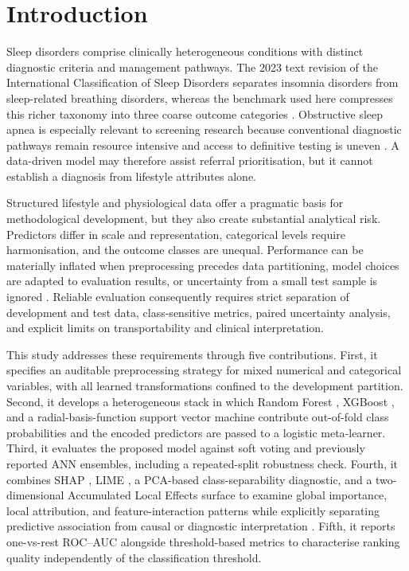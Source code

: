\documentclass{elektr}
\begin{document}
\section{Introduction}
Sleep disorders comprise clinically heterogeneous conditions with distinct diagnostic criteria and management pathways. The 2023 text revision of the International Classification of Sleep Disorders separates insomnia disorders from sleep-related breathing disorders, whereas the benchmark used here compresses this richer taxonomy into three coarse outcome categories \cite{aasm2023}. Obstructive sleep apnea is especially relevant to screening research because conventional diagnostic pathways remain resource intensive and access to definitive testing is uneven \cite{korkalainen2024,giorgi2025,bazoukis2023}. A data-driven model may therefore assist referral prioritisation, but it cannot establish a diagnosis from lifestyle attributes alone.

Structured lifestyle and physiological data offer a pragmatic basis for methodological development, but they also create substantial analytical risk. Predictors differ in scale and representation, categorical levels require harmonisation, and the outcome classes are unequal. Performance can be materially inflated when preprocessing precedes data partitioning, model choices are adapted to evaluation results, or uncertainty from a small test sample is ignored \cite{kapoor2023,efthimiou2024,collins2024}. Reliable evaluation consequently requires strict separation of development and test data, class-sensitive metrics, paired uncertainty analysis, and explicit limits on transportability and clinical interpretation.

This study addresses these requirements through five contributions. First, it specifies an auditable preprocessing strategy for mixed numerical and categorical variables, with all learned transformations confined to the development partition. Second, it develops a heterogeneous stack \cite{wolpert1992} in which Random Forest \cite{breiman2001}, XGBoost \cite{chen2016}, and a radial-basis-function support vector machine \cite{cortes1995} contribute out-of-fold class probabilities and the encoded predictors are passed to a logistic meta-learner. Third, it evaluates the proposed model against soft voting and previously reported ANN ensembles, including a repeated-split robustness check. Fourth, it combines SHAP \cite{lundberg2017}, LIME \cite{ribeiro2016}, a PCA-based class-separability diagnostic, and a two-dimensional Accumulated Local Effects surface \cite{apley2020} to examine global importance, local attribution, and feature-interaction patterns while explicitly separating predictive association from causal or diagnostic interpretation \cite{jung2023,allen2024,pesapane2026}. Fifth, it reports one-vs-rest ROC--AUC \cite{fawcett2006} alongside threshold-based metrics to characterise ranking quality independently of the classification threshold.
\end{document}
